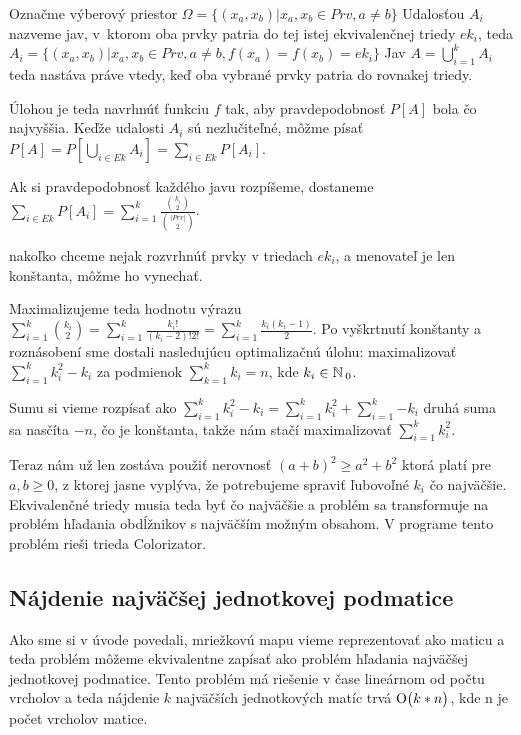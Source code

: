 Označme výberový priestor $\Omega = \{(x_a, x_b) | x_a, x_b \in Prv, a \not= b \}$
Udalosťou $A_i$ nazveme jav, v~ktorom oba prvky patria do tej istej ekvivalenčnej triedy $ek_i$,
teda $A_i = \{(x_a, x_b) | x_a, x_b \in Prv, a \not= b, f(x_a) = f(x_b) = ek_i \}$
Jav $A = \bigcup_{i=1}^{k} A_i$ teda nastáva práve vtedy,
 keď oba vybrané prvky patria do rovnakej triedy.

Úlohou je teda navrhnúť funkciu $f$ tak, aby pravdepodobnosť $P[A]$ bola čo najvyššia. 
Keďže udalosti $A_i$ sú nezlučiteľné, môžme písať 
$P[A] = P[\bigcup_{i \in Ek} A_i] = \sum_{i \in Ek}P[A_i]$.

Ak si pravdepodobnosť každého javu rozpíšeme, dostaneme 
$\sum_{i \in Ek}P[A_i] = \sum_{i = 1}^{k} \frac{{{k_i} \choose {2}}}{{{|Prv|} \choose {2}}}$.


nakoľko chceme nejak rozvrhnúť prvky v triedach $ek_i$, a menovateľ je len
konštanta, môžme ho vynechať.

Maximalizujeme teda hodnotu výrazu 
$\sum_{i = 1}^{k} {{k_i} \choose {2}} = \sum_{i = 1}^{k} {\frac{k_i!}{(k_i -2 )!2!}} = \sum_{i = 1}^{k}{\frac{k_i (k_i-1)}{2}}$.
Po vyškrtnutí konštanty a roznásobení sme dostali nasledujúcu optimalizačnú úlohu:
maximalizovať $\sum_{i = 1}^{k} {k_i^2 - k_i}$ za podmienok $\sum_{k=1}^{k}k_i = n$,
kde $k_i \in \mathbb{N}\,_0$.

Sumu si vieme rozpísať ako 
$\sum_{i = 1}^{k} {k_i^2 - k_i} = \sum_{i = 1}^{k} {k_i^2} + \sum_{i = 1}^{k}{-k_i}$
druhá suma sa nasčíta $-n$, čo je konštanta, takže nám stačí maximalizovať 
$\sum_{i = 1}^{k} {k_i^2}$.

Teraz nám už len zostáva použiť nerovnosť
$(a+b)^2 \geq a^2 + b^2$ ktorá platí pre $a,b \geq 0$, z ktorej jasne vyplýva, že potrebujeme spraviť ľubovoľné $k_i$ čo najväčšie.
Ekvivalenčné triedy musia teda byť čo najväčšie a problém sa transformuje na problém hľadania
obdĺžnikov s najväčším možným obsahom.
V programe tento problém rieši trieda Colorizator.


\subsection{Nájdenie najväčšej jednotkovej podmatice}
Ako sme si v úvode povedali, mriežkovú mapu vieme reprezentovať ako maticu a teda
problém môžeme ekvivalentne zapísať ako problém hľadania najväčšej jednotkovej podmatice.
Tento problém má riešenie v čase lineárnom od počtu vrcholov a teda nájdenie $k$ najväčších
jednotkových matíc trvá $\operatorname{O}\bigl(k*n\bigr)$, kde n je počet vrcholov matice.

